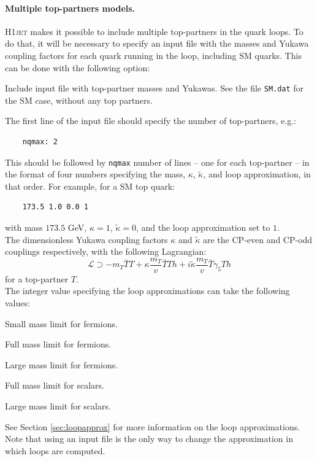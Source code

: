\documentclass[12pt]{article}
\begin{document}
\paragraph{Multiple top-partners models.}
\textsc{H1jet} makes it possible to include multiple top-partners in
the quark loops. To do that, it will be necessary to specify an input
file with the masses and Yukawa coupling factors for each quark
running in the loop, including SM quarks. This can be done with the
following option:
\begin{description}[labelindent=1cm, labelwidth =\widthof{\bfseries9999999999999999999999}, leftmargin = !] 
\item[\texttt{-i, --in <file>}] Include input file with top-partner
  masses and Yukawas. See the file \texttt{SM.dat} for the SM case,
  without any top partners.
\end{description} 
The first line of the input file should specify the number of top-partners, e.g.: 
\begin{lstlisting}
	nqmax: 2 
\end{lstlisting}
This should be followed by \texttt{nqmax} number of lines -- one for each top-partner -- in the format of four numbers specifying the mass, $\kappa$, $\tilde{\kappa}$, and loop approximation, in that order. For example, for a SM top quark: 
\begin{lstlisting}
	173.5 1.0 0.0 1 
\end{lstlisting}
with mass $173.5$ GeV, $\kappa = 1$, $\tilde{\kappa} = 0$, and the loop approximation set to $1$. \\ 

The dimensionless Yukawa coupling factors $\kappa$ and $\tilde{\kappa}$ are the CP-even and CP-odd couplings respectively, with the following Lagrangian: 
\begin{equation}
	\mathcal{L} \supset -m_T \bar{T}T + \kappa \frac{m_T}{v} \bar{T}T h + i \tilde{\kappa} \frac{m_T}{v} \bar{T} \gamma_5 T h 
\end{equation}
for a top-partner $T$. \\ 

The integer value specifying the loop approximations can take the following values: 
\begin{description}[labelindent=1cm, labelwidth =\widthof{\bfseries9999}, leftmargin = !] 
	\item[$0$] Small mass limit for fermions. 
	\item[$1$] Full mass limit for fermions. 
	\item[$2$] Large mass limit for fermions. 
	\item[$3$] Full mass limit for scalars. 
	\item[$4$] Large mass limit for scalars. 
\end{description}
See Section \ref{sec:loopapprox} for more information on the loop
approximations. Note that using an input file is the only way to
change the approximation in which loops are computed. 
\end{document}
